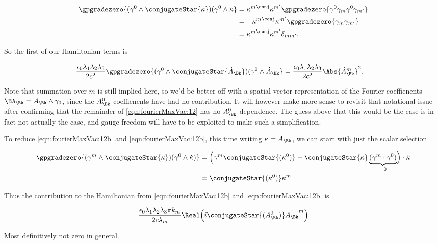 \begin{align*}
\gpgradezero{ (\gamma^0 \wedge \conjugateStar{\kappa} ) (\gamma^0 \wedge \kappa } 
&=
{\kappa^m}^{\conj} \kappa^{m'}
\gpgradezero{ \gamma^0 \gamma_m \gamma^0 \gamma_{m'} } \\
&=
-{\kappa^m}^{\conj} \kappa^{m'}
\gpgradezero{ \gamma_m \gamma_{m'} }  \\
&=
{\kappa^m}^{\conj} \kappa^{m'}
\delta_{m m'}.
\end{align*}

So the first of our Hamiltonian terms is

\begin{align}\label{eqn:fourierMaxVac:13}
\frac{\epsilon_0 \lambda_1 \lambda_2 \lambda_3}{2 c^2}
\gpgradezero{ (\gamma^0 \wedge \conjugateStar{\dot{A}_\Bk} ) (\gamma^0 \wedge \dot{A}_\Bk } 
&=
\frac{\epsilon_0 \lambda_1 \lambda_2 \lambda_3}{2 c^2}
\Abs{{{\dot{A}}_{\Bk}}^m}^2.
\end{align}

Note that summation over $m$ is still implied here, so we'd be better off with a spatial vector representation of the Fourier coeffienents $\BA_\Bk = A_\Bk \wedge \gamma_0$, since the $A_\Bk^0$ coeffienents have had no contribution.  It will however make more sense to revisit that notational issue after confirming that the remainder of \ref{eqn:fourierMaxVac:12} has no $A_\Bk^0$ dependence.  The guess above that this would be the case is in fact not actually the case, and gauge freedom will have to be exploited to make such a simplification.

To reduce \ref{eqn:fourierMaxVac:12b} and \ref{eqn:fourierMaxVac:12b}, this time writing $\kappa = A_\Bk$, we can start with just the scalar selection

\begin{align*}
\gpgradezero{ (\gamma^m \wedge \conjugateStar{\kappa} ) ( \gamma^0 \wedge \dot{\kappa} ) } 
&=
\Bigl( \gamma^m \conjugateStar{(\kappa^0)} - \conjugateStar{\kappa} \underbrace{(\gamma^m \cdot \gamma^0)}_{=0} \Bigr) \cdot \dot{\kappa} \\
&=
\conjugateStar{(\kappa^0)} \dot{\kappa}^m
\end{align*}

Thus the contribution to the Hamiltonian from \ref{eqn:fourierMaxVac:12b} and \ref{eqn:fourierMaxVac:12b} is

\begin{align}\label{eqn:fourierMaxVac:14}
\frac{\epsilon_0 \lambda_1 \lambda_2 \lambda_3 \pi k_m}{2 c \lambda_m} \Real \Bigl( i \conjugateStar{(A_\Bk^0)} \dot{A_\Bk}^m \Bigl)
\end{align}

Most definitively not zero in general.

\EndArticle
